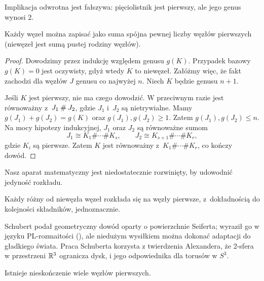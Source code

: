 Implikacja odwrotna jest fałszywa: pięciolistnik jest pierwszy, ale jego genus wynosi $2$.

\begin{proposition}
    Każdy węzeł można zapisać jako suma spójna pewnej liczby węzłów pierwszych (niewęzeł jest sumą pustej rodziny węzłów).
\end{proposition}

\begin{proof}
    Dowodzimy przez indukcję względem genusu $g(K)$.
    Przypadek bazowy $g(K) = 0$ jest oczywisty, gdyż wtedy $K$ to niewęzeł.
    Załóżmy więc, że fakt zachodzi dla węzłów $J$ genusu co najwyżej $n$.
    Niech $K$ będzie genusu $n + 1$.

    Jeśli $K$ jest pierwszy, nie ma czego dowodzić.
    W przeciwnym razie jest równoważny z~$J_1 \mathbin{\#} J_2$, gdzie $J_1$ i~$J_2$ są nietrywialne.
    Mamy $g(J_1)+g(J_2)=g(K)$ oraz $g(J_1),g(J_2)\geqslant 1$.
    Zatem $g(J_1),g(J_2)\leqslant n$.
    Na mocy hipotezy indukcyjnej, $J_1$ oraz $J_2$ są równoważne sumom
    \[
        J_1 \cong K_1\#\cdots\# K_s,\qquad
        J_2 \cong K_{s+1}\#\cdots\# K_r,
    \]
    gdzie $K_i$ są pierwsze.
    Zatem $K$ jest równoważny z~$K_1\#\cdots\# K_r$, co kończy dowód.
\end{proof}

Nasz aparat matematyczny jest niedostatecznie rozwinięty, by udowodnić jedyność rozkładu.

\begin{theorem}[Schubert, 1949]
    \label{thm:schubert}
    Każdy różny od niewęzła węzeł rozkłada się na węzły pierwsze, z~dokładnością do kolejności składników, jednoznacznie.
\end{theorem}

Schubert podał geometryczny dowód oparty o powierzchnie Seiferta; wyraził go w języku PL-rozmaitości (\cite{schubert49}), ale niedużym wysiłkiem można dokonać adaptacji do gładkiego świata.
Praca Schuberta korzysta z twierdzenia Alexandera, że 2-sfera w przestrzeni $\mathbb R^3$ ogranicza dysk, i jego odpowiednika dla torusów w $S^3$.

\begin{proposition}
\label{infty_primes}
    Istnieje nieskończenie wiele węzłów pierwszych.
\end{proposition}

